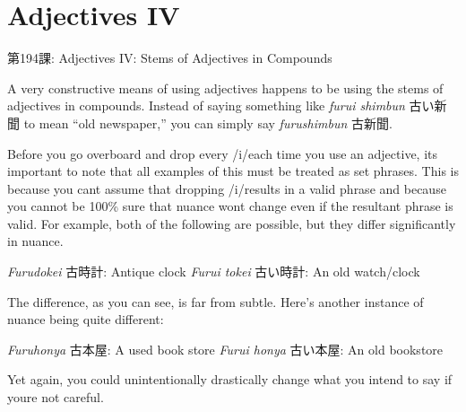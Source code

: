     
\chapter{Adjectives IV}

\begin{center}
\begin{Large}
第194課: Adjectives IV: Stems of Adjectives in Compounds 
\end{Large}
\end{center}
 
\par{ A very constructive means of using adjectives happens to be using the stems of adjectives in compounds. Instead of saying something like \emph{furui shimbun }古い新聞 to mean “old newspaper,” you can simply say \emph{furushimbun }古新聞. }

\par{ Before you go overboard and drop every \slash i\slash  each time you use an adjective, it\textquotesingle s important to note that all examples of this must be treated as set phrases. This is because you can\textquotesingle t assume that dropping \slash i\slash  results in a valid phrase and because you cannot be 100\% sure that nuance won\textquotesingle t change even if the resultant phrase is valid. For example, both of the following are possible, but they differ significantly in nuance. }
 
\par{\emph{Furudokei }古時計: Antique clock \hfill\break
 \emph{Furui tokei }古い時計: An old watch\slash clock }
 
\par{ The difference, as you can see, is far from subtle. Here's another instance of nuance being quite different: }
 
\par{\emph{Furuhon\textquotesingle ya }古本屋: A used book store \hfill\break
 \emph{Furui hon\textquotesingle ya }古い本屋: An old bookstore }
 
\par{ Yet again, you could unintentionally drastically change what you intend to say if you\textquotesingle re not careful. }
      
